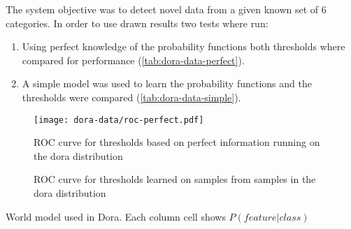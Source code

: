 \documentclass[a4paper]{article}
\begin{document}
The system objective was to detect novel data from a given known set of 6 categories.
In order to use drawn results two tests where run:
\begin{enumerate}
\item Using perfect knowledge of the probability functions both thresholds where compared for performance (\autoref{tab:dora-data-perfect}).
\item A simple model was used to learn the probability functions and the thresholds were compared (\autoref{tab:dora-data-simple}).
\end{enumerate}

\begin{figure}
\centering
\texttt{[image: dora-data/roc-perfect.pdf]}
\caption{\label{tab:dora-data-perfect}ROC curve for thresholds based on perfect information running on the dora distribution}
\end{figure}

\begin{figure}
\centering

\caption{\label{tab:dora-data-simple}ROC curve for thresholds learned on samples from samples in the dora distribution}
\end{figure}

\begin{sidewaystable}[h]
\begin{center}
\scalebox{0.35}{

}
\end{center}
\caption{\label{tab:dora-world-distribution}World model used in Dora. Each column cell shows $P(feature|class)$}
\end{sidewaystable}

\cleardoublepage
{}
{}



\end{document}
